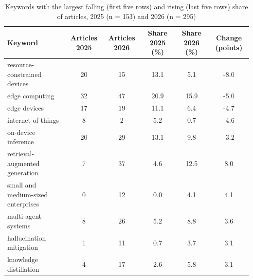 \begin{table}[htbp]
\centering
\small
\caption{Keywords with the largest falling (first five rows) and rising (last five rows) share of articles, 2025 (n = 153) and 2026 (n = 295)}
\label{tab:K}
\begin{tabularx}{\textwidth}{Yccccc}
\hline
\textbf{Keyword} & \textbf{Articles 2025} & \textbf{Articles 2026} & \textbf{Share 2025 (\%)} & \textbf{Share 2026 (\%)} & \textbf{Change (points)} \\ \hline
resource-constrained devices & 20 & 15 & 13.1 & 5.1 & -8.0 \\
edge computing & 32 & 47 & 20.9 & 15.9 & -5.0 \\
edge devices & 17 & 19 & 11.1 & 6.4 & -4.7 \\
internet of things & 8 & 2 & 5.2 & 0.7 & -4.6 \\
on-device inference & 20 & 29 & 13.1 & 9.8 & -3.2 \\
retrieval-augmented generation & 7 & 37 & 4.6 & 12.5 & 8.0 \\
small and medium-sized enterprises & 0 & 12 & 0.0 & 4.1 & 4.1 \\
multi-agent systems & 8 & 26 & 5.2 & 8.8 & 3.6 \\
hallucination mitigation & 1 & 11 & 0.7 & 3.7 & 3.1 \\
knowledge distillation & 4 & 17 & 2.6 & 5.8 & 3.1 \\ \hline
\end{tabularx}
\par\vspace{2pt}{\normalsize Source: Authors' analysis of OpenAlex data.}
\end{table}
